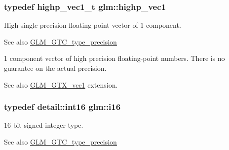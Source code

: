 \subsubsection[{\texorpdfstring{highp\+\_\+vec1}{highp_vec1}}]{\setlength{\rightskip}{0pt plus 5cm}typedef highp\+\_\+vec1\+\_\+t {\bf glm\+::highp\+\_\+vec1}}\hypertarget{group__gtc__type__precision_gab3f08c031846e7a95b49e81c48d920d3}{}\label{group__gtc__type__precision_gab3f08c031846e7a95b49e81c48d920d3}
High single-\/precision floating-\/point vector of 1 component. \begin{DoxySeeAlso}{See also}
\hyperlink{group__gtc__type__precision}{G\+L\+M\+\_\+\+G\+T\+C\+\_\+type\+\_\+precision}
\end{DoxySeeAlso}
1 component vector of high precision floating-\/point numbers. There is no guarantee on the actual precision. \begin{DoxySeeAlso}{See also}
\hyperlink{group__gtx__vec1}{G\+L\+M\+\_\+\+G\+T\+X\+\_\+vec1} extension. 
\end{DoxySeeAlso}
\subsubsection[{\texorpdfstring{i16}{i16}}]{\setlength{\rightskip}{0pt plus 5cm}typedef detail\+::int16 {\bf glm\+::i16}}\hypertarget{group__gtc__type__precision_ga35e5542ca05b29cc256fdafb8503d1fd}{}\label{group__gtc__type__precision_ga35e5542ca05b29cc256fdafb8503d1fd}
16 bit signed integer type. \begin{DoxySeeAlso}{See also}
\hyperlink{group__gtc__type__precision}{G\+L\+M\+\_\+\+G\+T\+C\+\_\+type\+\_\+precision} 
\end{DoxySeeAlso}

